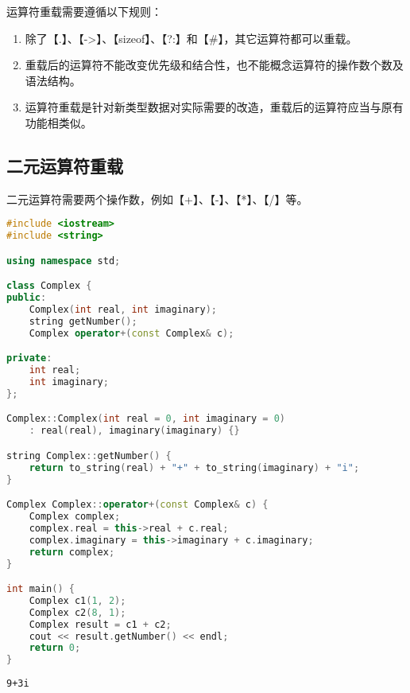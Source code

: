 运算符重载需要遵循以下规则：

\begin{enumerate}
	\item 除了【.】、【->】、【sizeof】、【?:】和【\#】，其它运算符都可以重载。

	\item 重载后的运算符不能改变优先级和结合性，也不能概念运算符的操作数个数及语法结构。

	\item 运算符重载是针对新类型数据对实际需要的改造，重载后的运算符应当与原有功能相类似。
\end{enumerate}

\vspace{0.5cm}

\subsection{二元运算符重载}

二元运算符需要两个操作数，例如【+】、【-】、【*】、【/】等。\\


\begin{lstlisting}[language=C++]
#include <iostream>
#include <string>

using namespace std;

class Complex {
public:
    Complex(int real, int imaginary);
    string getNumber();
    Complex operator+(const Complex& c);

private:
    int real;
    int imaginary;
};

Complex::Complex(int real = 0, int imaginary = 0)
    : real(real), imaginary(imaginary) {}

string Complex::getNumber() {
    return to_string(real) + "+" + to_string(imaginary) + "i";
}

Complex Complex::operator+(const Complex& c) {
    Complex complex;
    complex.real = this->real + c.real;
    complex.imaginary = this->imaginary + c.imaginary;
    return complex;
}

int main() {
    Complex c1(1, 2);
    Complex c2(8, 1);
    Complex result = c1 + c2;
    cout << result.getNumber() << endl;
    return 0;
}
\end{lstlisting}

\begin{tcolorbox}
	\begin{verbatim}
9+3i
	\end{verbatim}
\end{tcolorbox}


